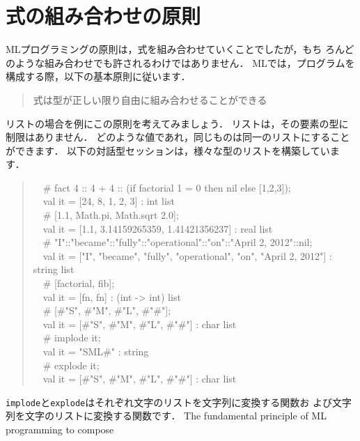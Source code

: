 \documentclass{jbook}
\newif\ifjp
\newcommand{\txt}[2]{#1}
\newcommand{\myem}{\mbox{\ \ }}
\begin{document}
\section{\txt{式の組み合わせの原則}{Principle in composing expressions}}
\label{sec:tutorialTypingprinciple}

\ifjp%
	MLプログラミングの原則は，式を組み合わせていくことでしたが，もち
ろんどのような組み合わせでも許されるわけではありません．
	MLでは，プログラムを構成する際，以下の基本原則に従います．
\begin{quote}
式は型が正しい限り自由に組み合わせることができる
\end{quote}
	リストの場合を例にこの原則を考えてみましょう．
	リストは，その要素の型に制限はありません．
	どのような値であれ，同じものは同一のリストにすることができます．
	以下の対話型セッションは，様々な型のリストを構築しています．
\begin{tt}
\begin{quote}
\myem \# fact 4 :: 4 + 4 :: (if factorial 1 = 0 then nil else [1,2,3]);
\\\myem  val it = [24, 8, 1, 2, 3] : int list
\\\myem   \# [1.1, Math.pi, Math.sqrt 2.0];
\\\myem   val it = [1.1, 3.14159265359, 1.41421356237] : real list
\\\myem   \# "I"::"became"::"fully"::"operational"::"on"::"April 2, 2012"::nil;
\\\myem   val it = ["I", "became", "fully", "operational", "on", "April 2, 2012"] : string list
\\\myem   \# [factorial, fib];
\\\myem   val it = [fn, fn] : (int  -> int) list
\\\myem   \# [\#"S", \#"M", \#"L", \#"\#"];
\\\myem   val it = [\#"S", \#"M", \#"L", \#"\#"] : char list
\\\myem   \# implode it;
\\\myem   val it = "SML\#" : string
\\\myem   \# explode it;
\\\myem   val it = [\#"S", \#"M", \#"L", \#"\#"] : char list
\end{quote}
\end{tt}
{\tt implode}と{\tt explode}はそれぞれ文字のリストを文字列に変換する関数お
よび文字列を文字のリストに変換する関数です．
\else%
	The fundamental principle of ML programming to compose
\end{document}
